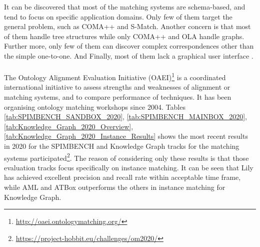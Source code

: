 It can be discovered that most of the matching systems are schema-based, and tend to focus on specific application domains. Only few of them target the general problem, such as COMA++ and S-Match. Another concern is that most of them handle tree structures while only COMA++ and OLA handle graphs. Further more, only few of them can discover complex correspondences other than the simple one-to-one. And Finally, most of them lack a graphical user interface \cite{euzenat2013d}.
\\\\
The Ontology Alignment Evaluation Initiative (OAEI)\footnote{\url{http://oaei.ontologymatching.org/}} is a coordinated international initiative to assess strengths and weaknesses of alignment or matching systems, and to compare performance of techniques. It has been organising ontology matching workshops since 2004. Tables \ref{tab:SPIMBENCH_SANDBOX_2020}, \ref{tab:SPIMBENCH_MAINBOX_2020}, \ref{tab:Knowledge_Graph_2020_Overview}, \ref{tab:Knowledge_Graph_2020_Instance_Results} shows the most recent results in 2020 for the SPIMBENCH and Knowledge Graph tracks for the matching systems participated\footnote{\url{https://project-hobbit.eu/challenges/om2020/}}. The reason of considering only these results is that those evaluation tracks focus specifically on instance matching. It can be seen that Lily has achieved excellent precision and recall rate within acceptable time frame, while AML and ATBox outperforms the others in instance matching for Knowledge Graph.

\begin{table}[ht!]
\caption{SPIMBENCH SANDBOX 2020}
\label{tab:SPIMBENCH_SANDBOX_2020}
\end{table}

